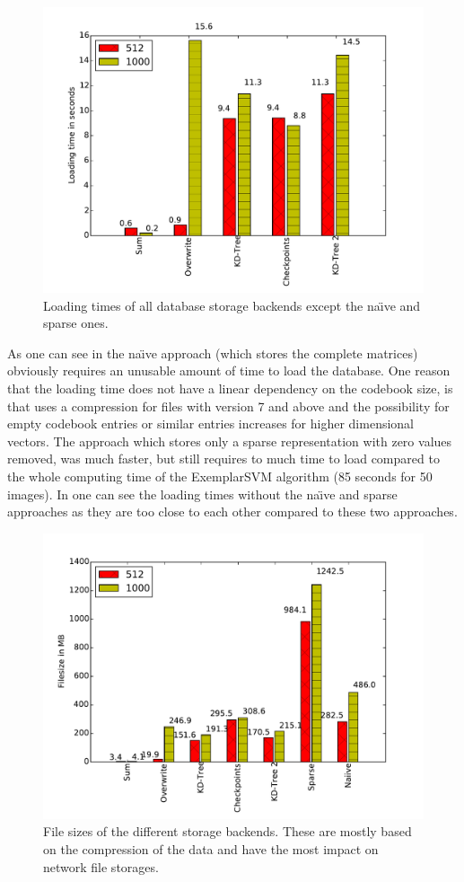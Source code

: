 \begin{figure}
\centering
\includegraphics[width=0.7\linewidth]{images/loading_time_2}
\caption{Loading times of all database storage backends except the na\"{\i}ve and sparse ones.}
\label{fig:loading_except_naiive}
\end{figure}


As one can see in  the na\"{\i}ve approach (which stores the complete matrices) obviously requires an unusable amount of time to load the database. One reason that the loading time does not have a linear dependency on the codebook size, is that \MATLAB uses a compression for files with version 7 and above and the possibility for empty codebook entries or similar entries increases for higher dimensional vectors. The approach which stores only a sparse representation with zero values removed, was much faster, but still requires to much time to load compared to the whole computing time of the ExemplarSVM algorithm (85 seconds for 50 images). In  one can see the loading times without the na\"{\i}ve and sparse approaches as they are too close to each other compared to these two approaches.


\begin{figure}
\centering
\includegraphics[width=0.7\linewidth]{images/file_size}
\caption[File sizes of the different storage backends]{File sizes of the different storage backends. These are mostly based on the compression of the data and have the most impact on network file storages.}
\label{fig:file_sizes}
\end{figure}

